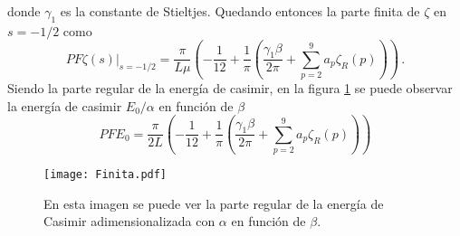 donde $\gamma _1 $ es la constante de Stieltjes. Quedando entonces la parte finita  de $\zeta$ en $s=-1/2$ como
\begin{equation}
PF \zeta (s) \Bigg| _{s=-1/2} = \frac{\pi}{L \mu}
					\left(
							- \frac{1}{12} +
							\frac{1}{\pi } \left(
											\frac{\gamma _1 \beta}{2 \pi} + 
											\sum _{p=2} ^{9} a _p \zeta _R (p)
												\right)
							\right) 
							\, .
\end{equation}
Siendo la parte regular de la energía de casimir, en la figura \ref{fig.finita} se puede observar la energía de casimir $E _0 / \alpha$ en función de $\beta$
\begin{equation}
PF E_0 = 
\frac{\pi}{2 L }
					\left(
							- \frac{1}{12} +
							\frac{1}{\pi } \left(
											\frac{\gamma _1 \beta}{2 \pi} + 
											\sum _{p=2} ^{9} a _p \zeta _R (p)
												\right)
							\right) 
\end{equation}



\begin{figure}
\centering
\texttt{[image: Finita.pdf]}
\caption{En esta imagen se puede ver la parte regular de la energía de Casimir adimensionalizada con $\alpha$ en función de $\beta$. }
\label{fig.finita}
\end{figure}





